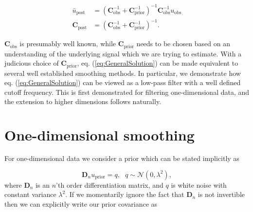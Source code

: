 \documentclass[10pt,a4paper]{article}
\begin{document}
\begin{equation}\label{eq:GeneralSolution}
\begin{split}
  \bar{u}_\mathrm{post} &= (\mathbf{C}_\mathrm{obs}^{-1} + 
                            \mathbf{C}_\mathrm{prior}^{-1})^{-1}
                            \mathbf{C}_\mathrm{obs}^{-1} u_\mathrm{obs}
\\
\mathbf{C}_\mathrm{post} &= (\mathbf{C}_\mathrm{obs}^{-1} + 
                             \mathbf{C}_\mathrm{prior}^{-1})^{-1}.                          
\end{split}
\end{equation}
 
$\mathbf{C}_\mathrm{obs}$ is presumably well known, while $\mathbf{C}_\mathrm{prior}$ needs to be chosen based on an understanding of the underlying signal which we are trying to estimate.  With a judicious choice of $\mathbf{C}_\mathrm{prior}$,  eq. (\ref{eq:GeneralSolution}) can be made equivalent to several well established smoothing methods.  In particular, we demonstrate how eq. (\ref{eq:GeneralSolution}) can be viewed as a low-pass filter with a well defined cutoff frequency. This is first demonstrated for filtering one-dimensional data, and the extension to higher dimensions follows naturally.  

\section*{One-dimensional smoothing}
For one-dimensional data we consider a prior which can be stated implicitly as

\begin{equation}\label{eq:ImplicitPrior1D}
  \mathbf{D}_{n} u_\mathrm{prior} = q, \ \ \ q \sim \mathcal{N}(0,\lambda^2),
\end{equation}  
where $\mathbf{D}_n$ is an $n$'th order differentiation matrix, and $q$ is white noise with constant variance $\lambda^2$.  If we momentarily ignore the fact that $\mathbf{D}_n$ is not invertible then we can explicitly write our prior covariance as
\end{document}
